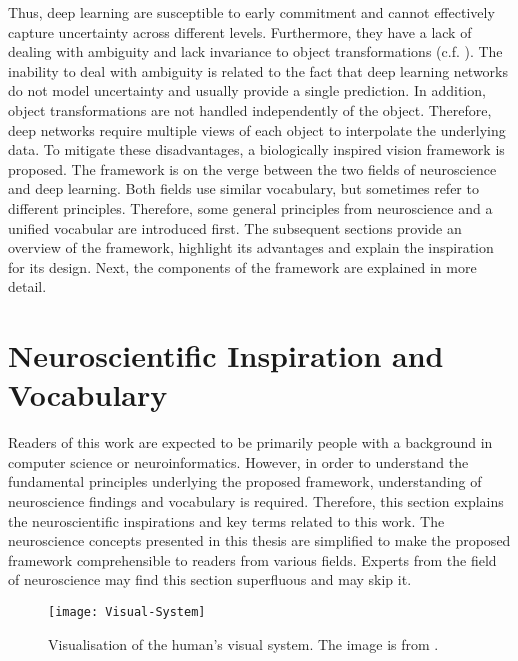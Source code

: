 Thus, deep learning are susceptible to early commitment and cannot effectively capture uncertainty across different levels. Furthermore, they have a lack of dealing with ambiguity and lack invariance to object transformations (c.f. ).
The inability to deal with ambiguity is related to the fact that deep learning networks do not model uncertainty and usually provide a single prediction. In addition, object transformations are not handled independently of the object. Therefore, deep networks require multiple views of each object to interpolate the underlying data.
To mitigate these disadvantages, a biologically inspired vision framework is proposed. 
The framework is on the verge between the two fields of neuroscience and deep learning.
Both fields use similar vocabulary, but sometimes refer to different principles. 
Therefore, some general principles from neuroscience and a unified vocabular are introduced first.
The subsequent sections provide an overview of the framework, highlight its advantages and explain the inspiration for its design. Next, the components of the framework are explained in more detail.



\section{Neuroscientific Inspiration and Vocabulary}
Readers of this work are expected to be primarily people with a background in computer science or neuroinformatics. However, in order to understand the fundamental principles underlying the proposed framework, understanding of neuroscience findings and vocabulary is required. Therefore, this section explains the neuroscientific inspirations and key terms related to this work.
The neuroscience concepts presented in this thesis are simplified to make the proposed framework comprehensible to readers from various fields. Experts from the field of neuroscience may find this section superfluous and may skip it.

\begin{figure}[h]
    \centering
    \texttt{[image: Visual-System]}
    \caption[Visualisation of the human's visual system]{Visualisation of the human's visual system. The image is from .}
\end{figure}

